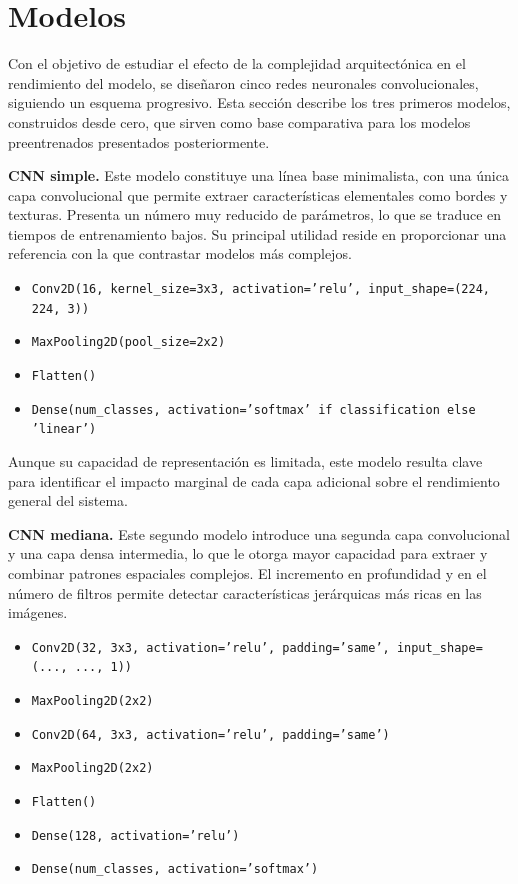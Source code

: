 \documentclass[11pt,spanish,listoffigures,listoftables]{tfgetsinf}
\begin{document}
\section{Modelos}

Con el objetivo de estudiar el efecto de la complejidad arquitectónica en el rendimiento del modelo, se diseñaron cinco 
redes neuronales convolucionales, siguiendo un esquema progresivo. Esta sección describe los tres primeros modelos, 
construidos desde cero, que sirven como base comparativa para los modelos preentrenados presentados posteriormente.

\textbf{CNN simple.}  
Este modelo constituye una línea base minimalista, con una única capa convolucional que permite extraer características 
elementales como bordes y texturas. Presenta un número muy reducido de parámetros, lo que se traduce en tiempos de entrenamiento 
bajos. Su principal utilidad reside en proporcionar una referencia con la que contrastar modelos más complejos.

\begin{itemize}
    \item \texttt{Conv2D(16, kernel\_size=3x3, activation='relu', input\_shape=(224, 224, 3))}
    \item \texttt{MaxPooling2D(pool\_size=2x2)}
    \item \texttt{Flatten()}
    \item \texttt{Dense(num\_classes, activation='softmax' if classification else 'linear')}
\end{itemize}

Aunque su capacidad de representación es limitada, este modelo resulta clave para identificar el impacto marginal 
de cada capa adicional sobre el rendimiento general del sistema.

\textbf{CNN mediana.}  
Este segundo modelo introduce una segunda capa convolucional y una capa densa intermedia, lo que le otorga mayor capacidad 
para extraer y combinar patrones espaciales complejos. El incremento en profundidad y en el número de filtros permite detectar 
características jerárquicas más ricas en las imágenes.

\begin{itemize}
    \item \texttt{Conv2D(32, 3x3, activation='relu', padding='same', input\_shape=(..., ..., 1))}
    \item \texttt{MaxPooling2D(2x2)}
    \item \texttt{Conv2D(64, 3x3, activation='relu', padding='same')}
    \item \texttt{MaxPooling2D(2x2)}
    \item \texttt{Flatten()}
    \item \texttt{Dense(128, activation='relu')}
    \item \texttt{Dense(num\_classes, activation='softmax')}
\end{itemize}
\end{document}
